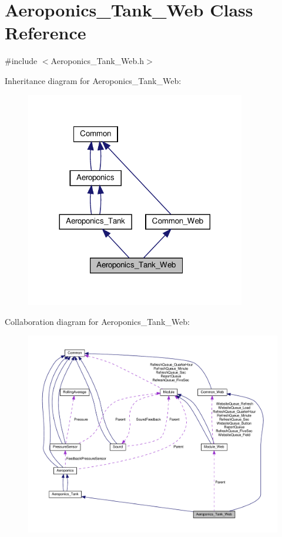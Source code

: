 \hypertarget{class_aeroponics___tank___web}{}\section{Aeroponics\+\_\+\+Tank\+\_\+\+Web Class Reference}
\label{class_aeroponics___tank___web}


{\ttfamily \#include $<$Aeroponics\+\_\+\+Tank\+\_\+\+Web.\+h$>$}



Inheritance diagram for Aeroponics\+\_\+\+Tank\+\_\+\+Web\+:
\nopagebreak
\begin{figure}[H]
\begin{center}
\leavevmode
\includegraphics[width=272pt]{class_aeroponics___tank___web__inherit__graph}
\end{center}
\end{figure}


Collaboration diagram for Aeroponics\+\_\+\+Tank\+\_\+\+Web\+:
\nopagebreak
\begin{figure}[H]
\begin{center}
\leavevmode
\includegraphics[width=350pt]{class_aeroponics___tank___web__coll__graph}
\end{center}
\end{figure}
